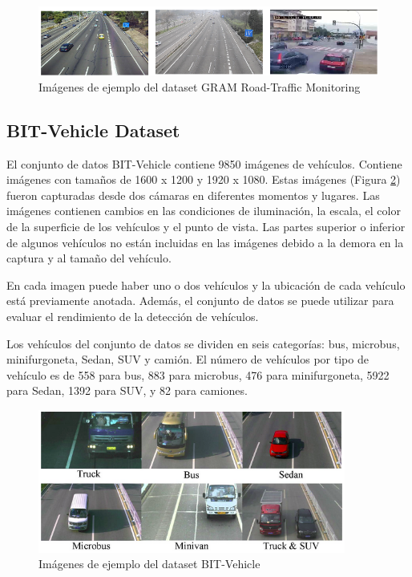 \begin{figure}
\begin{center}
	\includegraphics[width=1\textwidth]{figures/Estado_arte/gram.png}
   \caption{Imágenes de ejemplo del dataset GRAM Road-Traffic Monitoring}
	\label{fig.gram}
\end{center}
\end{figure}

\subsection{BIT-Vehicle Dataset}

El conjunto de datos BIT-Vehicle \cite{bit} contiene 9850 imágenes de vehículos. Contiene imágenes con tamaños de 1600 x 1200 y 1920 x 1080. Estas imágenes (Figura \ref{fig.bit}) fueron capturadas desde dos cámaras en diferentes momentos y lugares. Las imágenes contienen cambios en las condiciones de iluminación, la escala, el color de la superficie de los vehículos y el punto de vista. Las partes superior o inferior de algunos vehículos no están incluidas en las imágenes debido a la demora en la captura y al tamaño del vehículo. 

En cada imagen puede haber uno o dos vehículos y la ubicación de cada vehículo está previamente anotada. Además, el conjunto de datos se puede utilizar para evaluar el rendimiento de la detección de vehículos.

Los vehículos del conjunto de datos se dividen en seis categorías: bus, microbus, minifurgoneta, Sedan, SUV y camión. El número de vehículos por tipo de vehículo es de 558 para bus, 883 para microbus, 476 para minifurgoneta, 5922 para Sedan, 1392 para SUV, y 82 para camiones.

\begin{figure}[H] 
\begin{center}
	\includegraphics[width=0.9\textwidth]{figures/Estado_arte/bit.png}
   \caption{Imágenes de ejemplo del dataset BIT-Vehicle}
	\label{fig.bit}
\end{center}
\end{figure}


